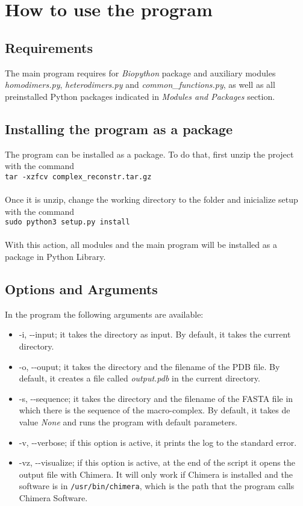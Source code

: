 \documentclass[a4paper,10pt]{report}
\begin{document}
\chapter{How to use the program}

\section{Requirements}

The main program requires for \textit{Biopython} package and auxiliary modules \textit{homodimers.py}, \textit{heterodimers.py} and \textit{common\_functions.py}, as well as all preinstalled Python packages indicated in \textit{Modules and Packages} section.


\section{Installing the program as a package}

The program can be installed as a package. To do that, first unzip the project with the command\\ \texttt{tar -xzfcv complex\_reconstr.tar.gz}\\\\
Once it is unzip, change the working directory to the folder and inicialize setup with the command\\ \texttt{sudo python3 setup.py install}\\\\
With this action, all modules and the main program will be installed as a package in Python Library.


\section{Options and Arguments}

In the program the following arguments are available:

\begin{itemize}
 \item -i, -{}-input; it takes the directory as input. By default, it takes the current directory.
 \item -o, -{}-ouput; it takes the directory and the filename of the PDB file. By default, it creates a file called \textit{output.pdb} in the current directory.
 \item -s, -{}-sequence; it takes the directory and the filename of the FASTA file in which there is the sequence of the macro-complex. By default, it takes de value \textit{None} and runs the program with default parameters.
 \item -v, -{}-verbose; if this option is active, it prints the log to the standard error. 
 \item -vz, -{}-visualize; if this option is active, at the end of the script it opens the output file with Chimera. It will only work if Chimera is installed and the software is in \texttt{/usr/bin/chimera}, which is the path that the program calls Chimera Software.
\end{itemize}
\end{document}
